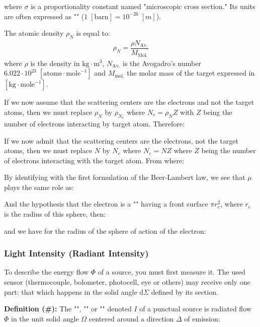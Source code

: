 	where $\sigma$ is a proportionality constant named "microscopic cross section." Its units are often expressed as "" ($1\;[\text{barn}]=10^{-26}\;[m]$).
	\begin{tcolorbox}[title=Remark,colframe=black,arc=10pt]
	The atomic density $\rho_N$ is equal to:
	\begin{gather*}
		\rho_N=\dfrac{\rho N_\text{Av.}}{M_\text{Mol.}}
	 \end{gather*}
	where  $\rho$ is the density in $\text{kg}\cdot\text{m}^3$, $N_\text{Av.}$ is the Avogadro's number $6.022\cdot 10^{23}\; [\text{atoms}\cdot \text{mole}^{-1}]$ and $M_\text{mol.}$ the molar mass of the target expressed in $[\text{kg}\cdot \text{mole}^{-1}]$.
	\end{tcolorbox}
	If we now assume that the scattering centers are the electrons and not the target atoms, then we must replace $\rho_N$ by $\rho_{N_e}$ where $N_e=\rho_NZ$ with $Z$ being the number of electrons interacting by target atom. Therefore:
	
	If we now admit that the scattering centers are the electrons, not the target atoms, then we must replace $N$ by $N_e$ where $N_e=NZ$ where $Z$  being the number of electrons interacting with the target atom. From where:
	
	By identifying with the first formulation of the Beer-Lambert law, we see that $\mu$ plays the same role as:
	
	And the hypothesis that the electron is a "" having a front surface $\pi r_e^2$, where $r_e$ is the radius of this sphere, then:
	
	and we have for the radius of the sphere of action of the electron:
	
	
	\subsubsection{Light Intensity (Radiant Intensity)}
	To describe the energy flow $\Phi$ of a source, you must first measure it. The used sensor (thermocouple, bolometer, photocell, eye or others) may receive only one part: that which happens in the solid angle  $\mathrm{d}\Sigma$ defined by its section.

	 \textbf{Definition (\#\mydef):} The "", "" or "" denoted $I$ of a punctual source is radiated flow $\Phi$ in the unit solid angle $\Omega$ centered around a direction $\Delta$ of emission:
	
